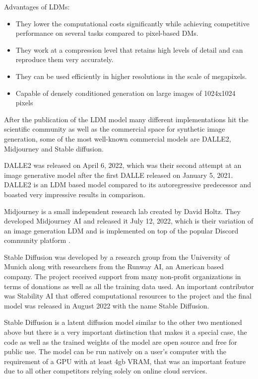 \documentclass[a4paper,one side,12pt]{book}
\begin{document}
Advantages of LDMs:

\begin{itemize}
\item
  They lower the computational costs significantly while achieving
  competitive performance on several tasks compared to pixel-based DMs.
\item
  They work at a compression level that retains high levels of detail
  and can reproduce them very accurately.
\item
  They can be used efficiently in higher resolutions in the scale of
  megapixels.
\item
  Capable of densely conditioned generation on large images of 1024x1024
  pixels
\end{itemize}

After the publication of the LDM model many different implementations
hit the scientific community as well as the commercial space for
synthetic image generation, some of the most well-known commercial
models are DALLE2\cite{openai_2022_dalle}, Midjourney \cite{midjourney} and Stable diffusion\cite{stable_Diff}.

DALLE2 was released on April 6, 2022, which was their second attempt at
an image generative model after the first DALLE released on January 5,
2021. DALLE2 is an LDM based model compared to its autoregressive
predecessor and boasted very impressive results in comparison.

Midjourney is a small independent research lab created by David Holtz.
They developed Midjourney AI and released it July 12, 2022, which is
their variation of an image generation LDM and is implemented on top of
the popular Discord community platform \cite{discord_2024_discord}.

Stable Diffusion was developed by a research group from the University
of Munich along with researchers from the Runway AI, an American based
company. The project received support from many non-profit organizations
in terms of donations as well as all the training data used. An
important contributor was Stability AI that offered computational
resources to the project and the final model was released in August 2022
with the name Stable Diffusion.

Stable Diffusion is a latent diffusion model similar to the other two
mentioned above but there is a very important distinction that makes it
a special case, the code as well as the trained weights of the model are
open source and free for public use. The model can be run natively on a
user's computer with the requirement of a GPU with at least 4gb VRAM,
that was an important feature due to all other competitors relying
solely on online cloud services.
\end{document}
